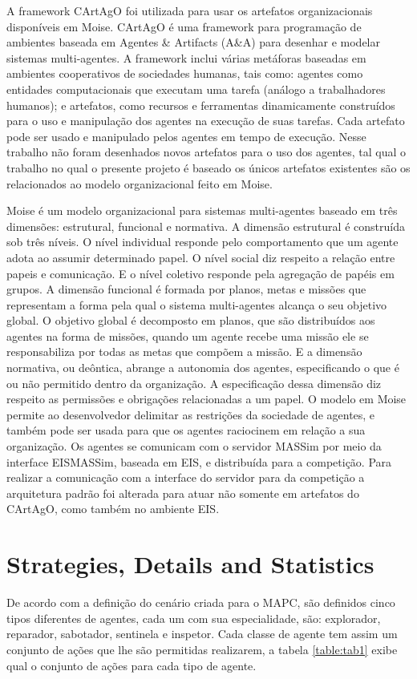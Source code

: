 \documentclass{llncs}
\begin{document}
A framework CArtAgO foi utilizada para usar os artefatos organizacionais disponíveis em Moise. CArtAgO é uma framework para programação de ambientes baseada em Agentes \& Artifacts (A\&A) para desenhar e modelar sistemas multi-agentes. A framework inclui várias metáforas baseadas em ambientes cooperativos de sociedades humanas, tais como: agentes como entidades computacionais que executam uma tarefa (análogo a trabalhadores humanos); e artefatos, como recursos e ferramentas dinamicamente construídos para o uso e manipulação dos agentes na execução de suas tarefas. Cada artefato pode ser usado e manipulado pelos agentes em tempo de execução. Nesse trabalho não foram desenhados novos artefatos para o uso dos agentes, tal qual o trabalho no qual o presente projeto é baseado os únicos artefatos existentes são os relacionados ao modelo organizacional feito em Moise.

Moise é um modelo organizacional para sistemas multi-agentes baseado em três dimensões: estrutural, funcional e normativa.
A dimensão estrutural é construída sob três níveis. O nível individual responde pelo comportamento que um agente adota ao assumir determinado papel. O nível social diz respeito a relação entre papeis e comunicação. E o nível coletivo responde pela agregação de papéis em grupos.
A dimensão funcional é formada por planos, metas e missões que representam a forma pela qual o sistema multi-agentes alcança o seu objetivo global. O objetivo global é decomposto em planos, que são distribuídos aos agentes na forma de missões, quando um agente recebe uma missão ele se responsabiliza por todas as metas que compõem a missão.
E a dimensão normativa, ou deôntica, abrange a autonomia dos agentes, especificando o que é ou não permitido dentro da organização. A especificação dessa dimensão diz respeito as permissões e obrigações relacionadas a um papel.
O modelo em Moise permite ao desenvolvedor delimitar as restrições da sociedade de agentes, e também pode ser usada para que os agentes raciocinem em relação a sua organização.
Os agentes se comunicam com o servidor MASSim por meio da interface EISMASSim, baseada em EIS, e distribuída para a competição. Para realizar a comunicação com a interface do servidor para da competição a arquitetura padrão foi alterada para atuar não somente em artefatos do CArtAgO, como também no ambiente EIS.

\section{Strategies, Details and Statistics}\label{sec:strategies}
De acordo com a definição do cenário criada para o MAPC, são definidos cinco tipos diferentes de agentes, cada um com sua especialidade, são: explorador, reparador, sabotador, sentinela e inspetor. Cada classe de agente tem assim um conjunto de ações que lhe são permitidas realizarem, a tabela \ref{table:tab1} exibe qual o conjunto de ações para cada tipo de agente.
\end{document}
